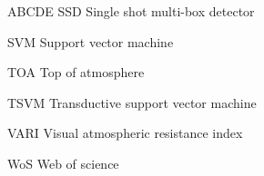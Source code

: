 \begin{seznamzkratek}{ABCDE}
	      {SSD}
	      {\qquad Single shot multi-box detector}

	      {SVM}
	      {\qquad Support vector machine}

	      {TOA}
	      {\qquad Top of atmosphere}

	      {TSVM}
	      {\qquad Transductive support vector machine}

	      {VARI}
	      {\qquad Visual atmospheric resistance index}

	      {WoS}
	      {\qquad Web of science}
	      
\end{seznamzkratek}